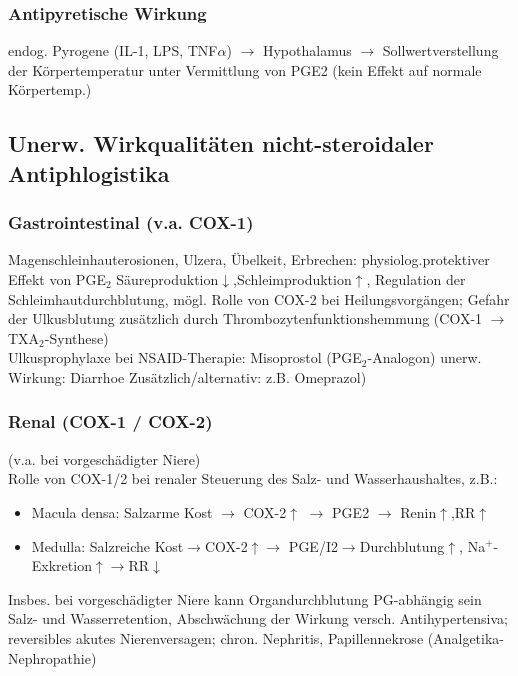 \documentclass[10pt,a4paper]{report}
\begin{document}
\subsubsection{Antipyretische Wirkung} %
\label{par:antipyretische_wirkung}
endog. Pyrogene (IL-1, LPS, TNF$\alpha$) $\rightarrow$ Hypothalamus $\rightarrow$ Sollwertverstellung der Körpertemperatur unter Vermittlung von PGE2 (kein Effekt auf normale Körpertemp.) 
\subsection{Unerw. Wirkqualitäten nicht-steroidaler Antiphlogistika} %
\label{ssub:unerw_wirkqualit_ten_nicht_steroidaler_antiphlogistika}
\subsubsection{Gastrointestinal (v.a. COX-1)} %
\label{par:gastrointestinal_v_a_cox_1_}
Magenschleinhauterosionen, Ulzera, Übelkeit, Erbrechen: physiolog.protektiver Effekt von PGE$_2$ Säureproduktion$\downarrow$,Schleimproduktion$\uparrow$, Regulation der Schleimhautdurchblutung, mögl. Rolle von COX-2 bei Heilungsvorgängen; Gefahr der Ulkusblutung zusätzlich durch Thrombozytenfunktionshemmung (COX-1 $\rightarrow$ TXA$_2$-Synthese)\\
Ulkusprophylaxe bei NSAID-Therapie: Misoprostol (PGE$_2$-Analogon) unerw. Wirkung: Diarrhoe Zusätzlich/alternativ: z.B. Omeprazol)
\subsubsection{Renal  (COX-1 / COX-2)} %
\label{par:renal_cox_1_cox_2_}
(v.a. bei vorgeschädigter Niere)\\
Rolle von COX-1/2 bei renaler Steuerung des Salz- und Wasserhaushaltes, z.B.:
\begin{itemize}
	\item Macula densa: Salzarme Kost $\rightarrow$ COX-2$\uparrow$ $\rightarrow$ PGE2 $\rightarrow$ Renin$\uparrow$,RR$\uparrow$
	\item Medulla: Salzreiche Kost$\rightarrow$COX-2$\uparrow$$\rightarrow$ PGE/I2$\rightarrow$Durchblutung$\uparrow$, Na$^+$-Exkretion$\uparrow$$\rightarrow$RR$\downarrow$
\end{itemize}
Insbes. bei vorgeschädigter Niere kann Organdurchblutung PG-abhängig sein Salz- und Wasserretention, Abschwächung der Wirkung versch. Antihypertensiva; reversibles akutes Nierenversagen; chron. Nephritis, Papillennekrose (Analgetika-Nephropathie)
\end{document}
